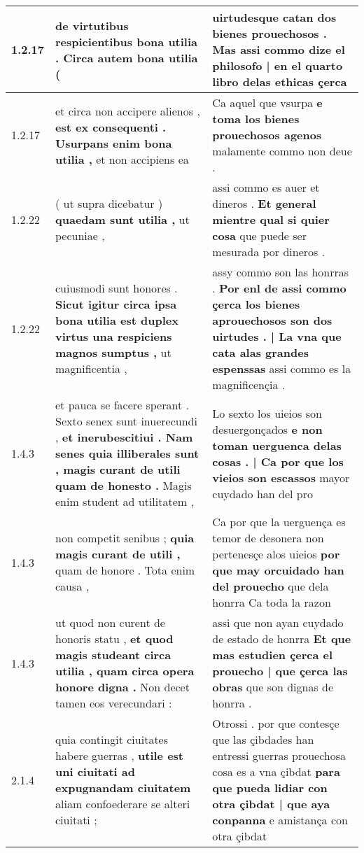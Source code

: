 \begin{tabular}{|p{1cm}|p{6.5cm}|p{6.5cm}|}
1.2.17 & de virtutibus respicientibus bona utilia . \textbf{ Circa autem bona utilia } ( & uirtudesque catan dos bienes prouechosos . \textbf{ Mas assi commo dize el philosofo | en el quarto libro delas ethicas } çerca \\\hline
1.2.17 & et circa non accipere alienos , \textbf{ est ex consequenti . Usurpans enim bona utilia , } et non accipiens ea & Ca aquel que vsurpa \textbf{ e toma los bienes prouechosos agenos } malamente commo non deue . \\\hline
1.2.22 & ( ut supra dicebatur ) \textbf{ quaedam sunt utilia , } ut pecuniae , & assi commo es auer et dineros . \textbf{ Et general mientre qual si quier cosa } que puede ser mesurada por dineros . \\\hline
1.2.22 & cuiusmodi sunt honores . \textbf{ Sicut igitur circa ipsa bona utilia est duplex virtus una respiciens magnos sumptus , } ut magnificentia , & assy commo son las honrras . \textbf{ Por enl de assi commo çerca los bienes aprouechosos son dos uirtudes . | La vna que cata alas grandes espenssas } assi commo es la magnificençia . \\\hline
1.4.3 & et pauca se facere sperant . Sexto senex sunt inuerecundi , \textbf{ et inerubescitiui . Nam senes quia illiberales sunt , magis curant de utili quam de honesto . } Magis enim student ad utilitatem , & Lo sexto los uieios son desuergonçados \textbf{ e non toman uerguenca delas cosas . | Ca por que los vieios son escassos } mayor cuydado han del pro \\\hline
1.4.3 & non competit senibus ; \textbf{ quia magis curant de utili , } quam de honore . Tota enim causa , & Ca por que la uerguença es temor de desonera non pertenesçe alos uieios \textbf{ por que may orcuidado han del prouecho } que dela honrra Ca toda la razon \\\hline
1.4.3 & ut quod non curent de honoris statu , \textbf{ et quod magis studeant circa utilia , quam circa opera honore digna . } Non decet tamen eos verecundari : & assi que non ayan cuydado de estado de honrra \textbf{ Et que mas estudien çerca el prouecho | que çerca las obras } que son dignas de honrra . \\\hline
2.1.4 & quia contingit ciuitates habere guerras , \textbf{ utile est uni ciuitati ad expugnandam ciuitatem } aliam confoederare se alteri ciuitati ; & Otrossi . por que contesçe que las çibdades han entressi guerras prouechosa cosa es a vna çibdat \textbf{ para que pueda lidiar con otra çibdat | que aya conpanna } e amistança con otra çibdat \\\hline

\end{tabular}
